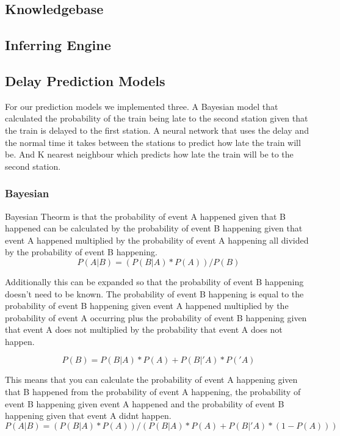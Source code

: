 \documentclass[11pt]{article}
\begin{document}
	\subsection{Knowledgebase}
	
	\subsection{Inferring Engine}
	
	\subsection{Delay Prediction Models}
	
	For our prediction models we implemented three. A Bayesian model that calculated the probability of the train being late to the second station given that the train is delayed to the first station. A neural network that uses the delay and the normal time it takes between the stations to predict how late the train will be. And K nearest neighbour which predicts how late the train will be to the second station.
	
	\subsubsection{Bayesian}
	
	Bayesian Theorm is that the probability of event A happened given that B happened can be calculated by the probability of event B happening given that event A happened multiplied by the probability of event A happening all divided by the probability of event B happening.	
	\[P(A|B) = (P(B|A) * P(A))/P(B)\]
	
	Additionally this can be expanded so that the probability of event B happening doesn't need to be known. The probability of event B happening is equal to the probability of event B happening given event A happened multiplied by the probability of event A occurring plus the probability of event B happening given that event A does not multiplied by the probability that event A does not happen.
	
	\[P(B) = P(B|A) * P(A) + P(B|'A) * P('A)\]
	
	This means that you can calculate the probability of event A happening given that B happened from the probability of event A happening, the probability of  event B happening given event A happened and the probability of event B happening given that event A didnt happen.
	\[P(A|B) = (P(B|A) * P(A))/(P(B|A) * P(A) + P(B|'A) * (1 - P(A)))\]	
	
\end{document}
